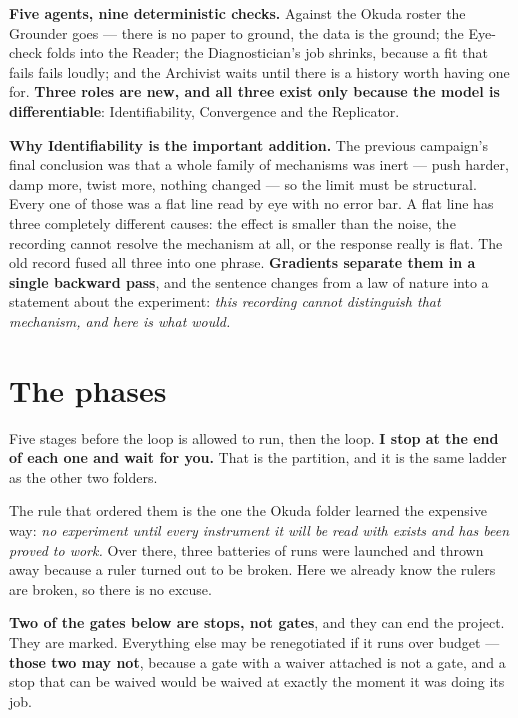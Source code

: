 \documentclass[11pt,a4paper]{article}
\begin{document}
\textbf{Five agents, nine deterministic checks.} Against the Okuda roster the Grounder goes --- there
is no paper to ground, the data is the ground; the Eye-check folds into the Reader; the
Diagnostician's job shrinks, because a fit that fails fails loudly; and the Archivist waits until
there is a history worth having one for. \textbf{Three roles are new, and all three exist only
because the model is differentiable}: Identifiability, Convergence and the Replicator.

\textbf{Why Identifiability is the important addition.} The previous campaign's final conclusion was
that a whole family of mechanisms was inert --- push harder, damp more, twist more, nothing changed
--- so the limit must be structural. Every one of those was a flat line read by eye with no error
bar. A flat line has three completely different causes: the effect is smaller than the noise, the
recording cannot resolve the mechanism at all, or the response really is flat. The old record fused
all three into one phrase. \textbf{Gradients separate them in a single backward pass}, and the
sentence changes from a law of nature into a statement about the experiment: \emph{this recording
cannot distinguish that mechanism, and here is what would.}

\section{The phases}

Five stages before the loop is allowed to run, then the loop. \textbf{I stop at the end of each one
and wait for you.} That is the partition, and it is the same ladder as the other two folders.

The rule that ordered them is the one the Okuda folder learned the expensive way: \emph{no
experiment until every instrument it will be read with exists and has been proved to work.} Over
there, three batteries of runs were launched and thrown away because a ruler turned out to be
broken. Here we already know the rulers are broken, so there is no excuse.

\textbf{Two of the gates below are stops, not gates}, and they can end the project. They are marked.
Everything else may be renegotiated if it runs over budget --- \textbf{those two may not}, because a
gate with a waiver attached is not a gate, and a stop that can be waived would be waived at exactly
the moment it was doing its job.
\end{document}
